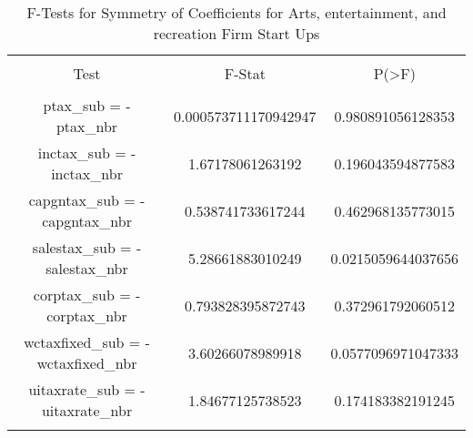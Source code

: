 
\begin{table}[!htbp] \centering 
  \caption{F-Tests for Symmetry of Coefficients for Arts, entertainment, and recreation Firm Start Ups} 
  \label{} 
\begin{tabular}{@{\extracolsep{5pt}} ccc} 
\\[-1.8ex]\hline 
\hline \\[-1.8ex] 
Test & F-Stat & P(\textgreater F) \\ 
\hline \\[-1.8ex] 
ptax\_sub = -ptax\_nbr & 0.000573711170942947 & 0.980891056128353 \\ 
inctax\_sub = -inctax\_nbr & 1.67178061263192 & 0.196043594877583 \\ 
capgntax\_sub = -capgntax\_nbr & 0.538741733617244 & 0.462968135773015 \\ 
salestax\_sub = -salestax\_nbr & 5.28661883010249 & 0.0215059644037656 \\ 
corptax\_sub = -corptax\_nbr & 0.793828395872743 & 0.372961792060512 \\ 
wctaxfixed\_sub = -wctaxfixed\_nbr & 3.60266078989918 & 0.0577096971047333 \\ 
uitaxrate\_sub = -uitaxrate\_nbr & 1.84677125738523 & 0.174183382191245 \\ 
\hline \\[-1.8ex] 
\end{tabular} 
\end{table} 

